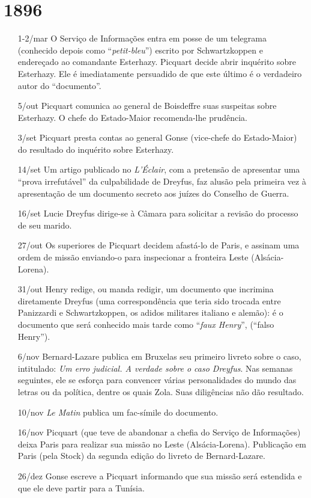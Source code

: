 \section{1896}
\begin{itemize} 
\setlength\itemsep{-1mm}
\item[1-2/mar] O Serviço de Informações entra em posse de um telegrama
(conhecido depois como ``\textit{petit-bleu}'') escrito por Schwartzkoppen e
endereçado ao comandante Esterhazy. Picquart decide abrir inquérito sobre
Esterhazy. Ele é imediatamente persuadido de que este último é o verdadeiro
autor do ``documento''.

\item[5/out] Picquart comunica ao general de Boisdeffre suas suspeitas sobre
Esterhazy. O chefe do Estado-Maior recomenda-lhe prudência.

\item[3/set] Picquart presta contas ao general Gonse (vice-chefe do
Estado-Maior) do resultado do inquérito sobre Esterhazy.

\item[14/set] Um artigo publicado no \textit{L'Éclair}, com a pretensão de
apresentar uma ``prova irrefutável'' da culpabilidade de Dreyfus, faz alusão
pela primeira vez à apresentação de um documento secreto aos juízes do Conselho
de Guerra.

\item[16/set] Lucie Dreyfus dirige-se à Câmara para solicitar a revisão do
processo de seu marido.

\item[27/out] Os superiores de Picquart decidem afastá-lo de Paris, e assinam
uma ordem de missão enviando-o para inspecionar a fronteira Leste
(Alsácia-Lorena).  

\item[31/out] Henry redige, ou manda redigir, um documento que incrimina
diretamente Dreyfus (uma correspondência que teria sido trocada entre
Panizzardi e Schwartzkoppen, os adidos militares italiano e alemão): é o
documento que será conhecido mais tarde como ``\textit{faux Henry}'', (``falso
Henry'').  

\item[6/nov] Bernard-Lazare publica em Bruxelas seu primeiro livreto sobre o
caso, intitulado: \textit{Um erro judicial. A verdade sobre o caso Dreyfus}.
Nas semanas seguintes, ele se esforça para convencer várias personalidades do
mundo das letras ou da política, dentre os quais Zola. Suas diligências não dão
resultado. 

\item[10/nov] \textit{Le Matin} publica um fac-símile do documento. 

\item[16/nov] Picquart (que teve de abandonar a chefia do Serviço de
Informações) deixa Paris para realizar sua missão no Leste (Alsácia-Lorena).
Publicação em Paris (pela Stock) da segunda edição do livreto de
Bernard-Lazare. 

\item[26/dez] Gonse escreve a Picquart informando que sua missão será estendida
e que ele deve partir para a Tunísia.
\end{itemize}


